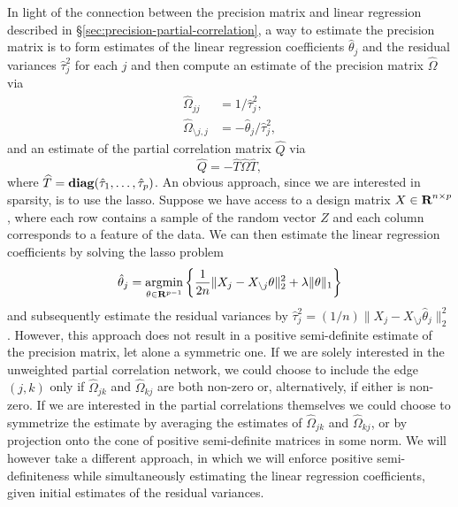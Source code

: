 \documentclass{article}
\begin{document}
In light of the connection between the precision matrix and linear regression
described in \S\ref{sec:precision-partial-correlation}, a way to estimate the
precision matrix is to form estimates of the linear regression coefficients
$\hat\theta_j$ and the residual variances $\hat \tau_j^2$ for each $j$ and then
compute an estimate of the precision matrix $\widehat{\Omega}$ via 
\[
    \begin{aligned}
        \widehat{\Omega}_{jj} &= 1 / \hat\tau_j^2, \\
        \widehat{\Omega}_{\setminus j, j} &= -\hat\theta_j / \hat\tau_j^2,
    \end{aligned}
\]
and an estimate of the partial correlation matrix $\widehat{Q}$ via
\[
    \widehat{Q} = -\widehat{T} \widehat{\Omega} \widehat{T},
\]
where $\widehat{T} = \mathop{\bf diag}(\hat\tau_1, \dots, \hat\tau_p)$. An obvious approach,
since we are interested in sparsity, is to use the lasso. Suppose we have access
to a design matrix $X \in {\mbox{\bf R}}^{n \times p}$, where each row contains a sample
of the random vector $Z$ and each column corresponds to a feature of the data.
We can then estimate the linear regression coefficients by solving the lasso
problem
\[
    \hat \theta_j = \argmin_{\theta \in \mathbf{R}^{p-1}} \left\{\frac{1}{2n} \|X_j - X_{\setminus j} \theta\|_2^2 + \lambda \|\theta\|_1 \right\}
\]
and subsequently estimate the residual variances by $\hat \tau_j^2 = (1/n) \|X_j
- X_{\setminus j} \hat \theta_j\|_2^2$. However, this approach does not result
in a positive semi-definite estimate of the precision matrix, let alone a
symmetric one. If we are solely interested in the unweighted partial correlation
network, we could choose to include the edge $(j,k)$ only if
$\widehat{\Omega}_{jk}$ and $\widehat{\Omega}_{kj}$ are both non-zero or,
alternatively, if either is non-zero. If we are interested in the partial
correlations themselves we could choose to symmetrize the estimate by averaging
the estimates of $\widehat{\Omega}_{jk}$ and $\widehat{\Omega}_{kj}$, or by
projection onto the cone of positive semi-definite matrices in some norm. We
will however take a different approach, in which we will enforce positive
semi-definiteness while simultaneously estimating the linear regression
coefficients, given initial estimates of the residual variances.
\end{document}
